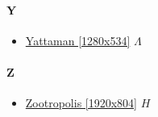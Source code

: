 	\paragraph{Y} \hypertarget{FIY}{}
		\begin{itemize}
			\item \href{https://mega.nz/#!5OoTUJ4L!3L3NZ7oRyQgx3_JBsidf3WSKZSsmqqWPeAWCJYsH_P0} {Yattaman [1280x534]}  $\varLambda$ \\ 
		
		
		
		\end{itemize}
	
	\paragraph{Z} \hypertarget{FIZ}{}
		\begin{itemize}
			\item \href{https://mega.nz/#!L8o2jQxQ!CYHqlhThbcEFdcWld6SvqkSqSkiLtzILR2Zzpy0bUNA} {Zootropolis [1920x804]}  $H$ \\ 
	
		
		
	\end{itemize}	
